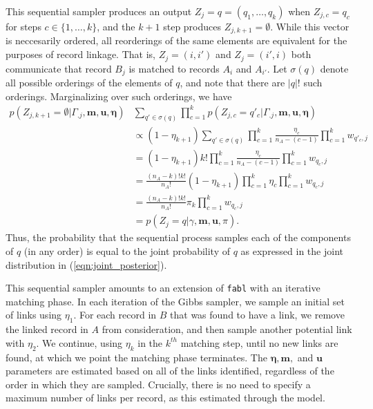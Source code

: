 \documentclass[12pt,letterpaper]{article}
\newcommand{\1}[1]{\mathbb{I}\!\left[#1\right]} %
\begin{document}
This sequential sampler produces an output $Z_j = q = (q_1, \ldots, q_k)$ when $Z_{j, c} = q_c$ for steps $c \in \{1, \ldots, k\}$, and the $k+1$ step produces $Z_{j, k+1} = \emptyset$. While this vector is neccesarily ordered, all reorderings of the same elements are equivalent for the purposes of record linkage.   That is, $Z_j = (i, i')$ and $Z_j = (i', i)$ both communicate that record $B_j$ is matched to records $A_i$ and $A_{i'}$. Let $\sigma(q)$ denote all possible orderings of the elements of $q$, and note that there are $|q|!$ such orderings. Marginalizing over such orderings, we have
\begin{align}
	p(Z_{j, k+1} = \emptyset | \Gamma_{.j}, \bm{m}, \bm{u}, \bm{\eta}) &\sum_{q' \in \sigma(q)} \prod_{c = 1}^{k} p(Z_{j, c} = q'_c|\Gamma_{.j}, \bm{m}, \bm{u}, \bm{\eta}) \\
	&\propto (1 - \eta_{k+1}) \sum_{q' \in \sigma(q)} \prod_{c = 1}^{k} \frac{\eta_{c} }{n_A - (c - 1)}  \prod_{c = 1}^{k} w_{q'_c, j} \\
	&=(1 - \eta_{k+1}) k! \prod_{c = 1}^{k} \frac{\eta_{c} }{n_A - (c - 1)}  \prod_{c = 1}^{k} w_{q_c, j} \\
	&= \frac{(n_A - k)!k!}{n_A!} (1 - \eta_{k+1})\prod_{c = 1}^{k} \eta_{c} \prod_{c = 1}^{k} w_{q_c, j} \\
	&= \frac{(n_A - k)!k!}{n_A!} \pi_k \prod_{c = 1}^{k} w_{q_c, j} \\
	&= p\left(Z_j  = q |\gamma, \bm{m}, \bm{u}, \pi\right).
\end{align}
Thus, the probability that the sequential process samples each of the components of $q$ (in any order) is equal to the joint probability of $q$ as expressed in the joint distribution in (\ref{eqn:joint_posterior}).

This sequential sampler amounts to an extension of \texttt{fabl} with an iterative matching phase. In each iteration of the Gibbs sampler, we sample an initial set of links using $\eta_1$. For each record in $B$ that was found to have a link, we remove the linked record in $A$ from consideration, and then sample another potential link with $\eta_2$. We continue, using $\eta_k$ in the $k^{th}$ matching step, until no new links are found, at which we point the matching phase terminates. The $\bm{\eta}, \bm{m},$ and $\bm{u}$ parameters are estimated based on all of the links identified, regardless of the order in which they are sampled. Crucially, there is no need to specify a maximum number of links per record, as this estimated through the model.
\end{document}
